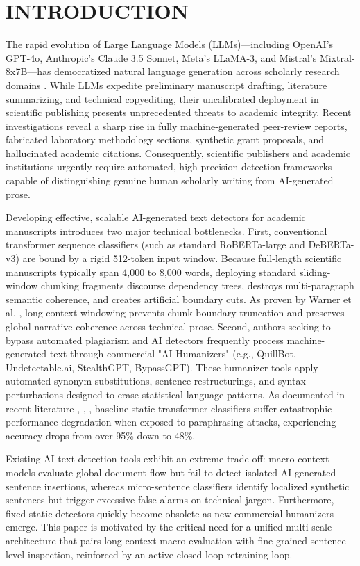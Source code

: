 \documentclass[conference]{IEEEtran}
\begin{document}
\section{INTRODUCTION}
The rapid evolution of Large Language Models (LLMs)—including OpenAI's GPT-4o, Anthropic's Claude 3.5 Sonnet, Meta's LLaMA-3, and Mistral's Mixtral-8x7B—has democratized natural language generation across scholarly research domains \cite{gupta2024navigating}. While LLMs expedite preliminary manuscript drafting, literature summarizing, and technical copyediting, their uncalibrated deployment in scientific publishing presents unprecedented threats to academic integrity. Recent investigations reveal a sharp rise in fully machine-generated peer-review reports, fabricated laboratory methodology sections, synthetic grant proposals, and hallucinated academic citations. Consequently, scientific publishers and academic institutions urgently require automated, high-precision detection frameworks capable of distinguishing genuine human scholarly writing from AI-generated prose.

Developing effective, scalable AI-generated text detectors for academic manuscripts introduces two major technical bottlenecks. First, conventional transformer sequence classifiers (such as standard RoBERTa-large and DeBERTa-v3) are bound by a rigid 512-token input window. Because full-length scientific manuscripts typically span 4,000 to 8,000 words, deploying standard sliding-window chunking fragments discourse dependency trees, destroys multi-paragraph semantic coherence, and creates artificial boundary cuts. As proven by Warner et al. \cite{warner2025modernbert}, long-context windowing prevents chunk boundary truncation and preserves global narrative coherence across technical prose. Second, authors seeking to bypass automated plagiarism and AI detectors frequently process machine-generated text through commercial "AI Humanizers" (e.g., QuillBot, Undetectable.ai, StealthGPT, BypassGPT). These humanizer tools apply automated synonym substitutions, sentence restructurings, and syntax perturbations designed to erase statistical language patterns. As documented in recent literature \cite{tasnim2026robust}, \cite{sanyal2026adversarial}, \cite{zheng2025alertme}, baseline static transformer classifiers suffer catastrophic performance degradation when exposed to paraphrasing attacks, experiencing accuracy drops from over 95\% down to 48\%.

Existing AI text detection tools exhibit an extreme trade-off: macro-context models evaluate global document flow but fail to detect isolated AI-generated sentence insertions, whereas micro-sentence classifiers identify localized synthetic sentences but trigger excessive false alarms on technical jargon. Furthermore, fixed static detectors quickly become obsolete as new commercial humanizers emerge. This paper is motivated by the critical need for a unified multi-scale architecture that pairs long-context macro evaluation with fine-grained sentence-level inspection, reinforced by an active closed-loop retraining loop.
\end{document}
